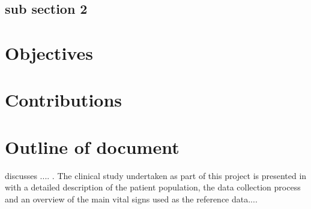 \subsection{sub section 2}

\lipsum[10-12]\cite{cote1988effect,aravindhan2000sulfhemoglobinemia,clayton1991pulse,clayton1991comparison,webb1991potential,212885,964165,Chaichulee2017FG}

\section{Objectives}

\lipsum[2-4]

\section{Contributions}

\lipsum[2-4]

\section{Outline of document}

 discusses .... . The clinical study undertaken as part of this project is presented in  with a detailed description of the patient population, the data collection process and an overview of the main vital signs used as the reference data....

\lipsum[2-4]
